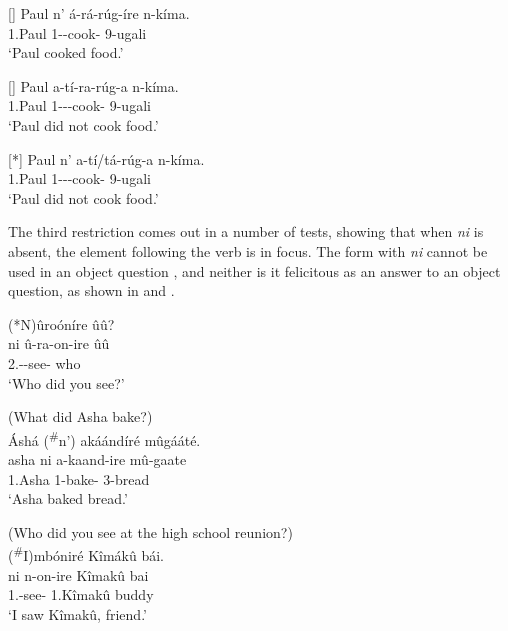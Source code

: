 \documentclass[output=paper]{langscibook}
\begin{document}
\ea
\citep[80, glosses adapted]{Muriungi2005}

\ea
[]{
\gll
Paul  n’ á-rá-rúg-íre  n-kíma.\\
1.Paul \FOC{}  1\SM-\YPST{}-cook-\PFV{} 9-ugali\\
\glt
‘Paul cooked food.’
}

\ex
[]{
\gll
Paul  a-tí-ra-rúg-a  n-kíma.\\
1.Paul 1\SM-\NEG-\YPST{}-cook-\FV{} 9-ugali\\
\glt
‘Paul did not cook food.’
}


\ex
[*]{
\label{bkm:Ref94515962}
\gll
Paul  n’  a-tí/tá-rúg-a  n-kíma.\\
1.Paul \FOC{}  1\SM-\NEG-\YPST{}-cook-\FV{} 9-ugali\\
\glt
‘Paul did not cook food.’
}

\z
\z


The third restriction comes out in a number of tests, showing that when \textit{ni} is absent, the element following the verb is in focus. The form with \textit{ni} cannot be used in an object question , and neither is it felicitous as an answer to an object question, as shown in  and .

\ea
\label{bkm:Ref125199378}
(*N)ûroóníre ûû?\\
\gll
ni  û-ra-on-ire  ûû\\
\FOC{}  2\SG.\SM-\YPST{}-see-\PFV{} who\\
\glt
‘Who did you see?’

\z

\ea
\label{bkm:Ref125199394}
(What did Asha bake?)\\
Áshá (\textsuperscript{\#}n’) akáándíré mûgááté.\\
\gll
asha  ni  a-kaand-ire  mû-gaate\\
1.Asha \FOC{}  1\SM{}-bake-\PFV{} 3-bread\\
\glt ‘Asha baked bread.’


\z

\ea
\label{ex:kimakufriend}
(Who did you see at the high school reunion?)\\
(\textsuperscript{\#}I)mbóniré Kîmákû bái.\\
\gll
ni  n-on-ire  Kîmakû  bai\\
\FOC{}  1\SG.\SM{}-see-\PFV{} 1.Kîmakû  buddy\\
\glt ‘I saw Kîmakû, friend.’
\end{document}
